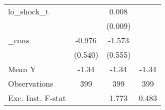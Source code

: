 {\begin{tabular}{l*{3}{c}}
\addlinespace
lo\_shock\_t  &                     &       0.008         &                     \\
            &                     &     (0.009)         &                     \\
\addlinespace
\_cons      &      -0.976\sym{*}  &      -1.573\sym{***}&                     \\
            &     (0.540)         &     (0.555)         &                     \\
\midrule
Mean Y      &       -1.34         &       -1.34         &       -1.34         \\
Observations&         399         &         399         &         399         \\
Exc. Inst. F-stat&                     &       1.773         &       0.483         \\
\bottomrule
\end{tabular}
}
